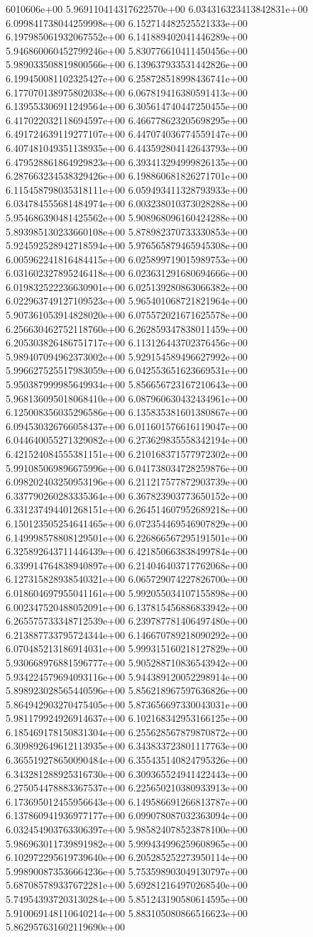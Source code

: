 6010606e+00	5.969110414317622570e+00	6.034316323413842831e+00	6.099841738044259998e+00	6.152714482525521333e+00	6.197985061932067552e+00	6.141889402041446289e+00	5.946860060452799246e+00	5.830776610411450456e+00	5.989033508819800566e+00	6.139637933531442826e+00	6.199450081102325427e+00	6.258728518998436741e+00	6.177070138975802038e+00	6.067819416380591413e+00	6.139553306911249564e+00	6.305614740447250455e+00	6.417022032118694597e+00	6.466778623205698295e+00	6.491724639119277107e+00	6.447074036774559147e+00	6.407481049351138935e+00	6.443592804142643793e+00	6.479528861864929823e+00	6.393413294999826135e+00	6.287663234538329426e+00	6.198860681826271701e+00	6.115458798035318111e+00	6.059493411328793933e+00	6.034784555681484974e+00	6.003238010373028288e+00	5.954686390481425562e+00	5.908968096160424288e+00	5.893985130233660108e+00	5.878982370733330853e+00	5.924592528942718594e+00	5.976565879465945308e+00	6.005962241816484415e+00	6.025899719015989753e+00	6.031602327895246418e+00	6.023631291680694666e+00	6.019832522236630901e+00	6.025139280863066382e+00	6.022963749127109523e+00	5.965401068721821964e+00	5.907361053914828020e+00	6.075572021671625578e+00	6.256630462752118760e+00	6.262859347838011459e+00	6.205303826486751717e+00	6.113126443702376456e+00	5.989407094962373002e+00	5.929154589496627992e+00	5.996627525517983059e+00	6.042553651623669531e+00	5.950387999985649934e+00	5.856656723167210643e+00	5.968136095018068410e+00	6.087960630432434961e+00	6.125008356035296586e+00	6.135835381601380867e+00	6.094530326766058437e+00	6.011601576616119047e+00	6.044640055271329082e+00	6.273629835558342194e+00	6.421524084555381151e+00	6.210168371577972302e+00	5.991085069896675996e+00	6.041738034728259876e+00	6.098202403250953196e+00	6.211217577872903739e+00	6.337790260283335364e+00	6.367823903773650152e+00	6.331237494401268151e+00	6.264514607952689218e+00	6.150123505254641465e+00	6.072354469546907829e+00	6.149998578808129501e+00	6.226866567295191501e+00	6.325892643711446439e+00	6.421850663838499784e+00	6.339914764838940897e+00	6.214046403717762068e+00	6.127315828938540321e+00	6.065729074227826700e+00	6.018604697955041161e+00	5.992055034107155898e+00	6.002347520488052091e+00	6.137815456886833942e+00	6.265575733348712539e+00	6.239787781406497480e+00	6.213887733795724344e+00	6.146670789218090292e+00	6.070485213186914031e+00	5.999315160218127829e+00	5.930668976881596777e+00	5.905288710836543942e+00	5.934224579694093116e+00	5.944389120052298914e+00	5.898923028565440596e+00	5.856218967597636826e+00	5.864942903270475405e+00	5.873656697330043031e+00	5.981179924926914637e+00	6.102168342953166125e+00	6.185469178150831304e+00	6.255628567879870872e+00	6.309892649612113935e+00	6.343833723801117763e+00	6.365519278650090484e+00	6.355435140824795326e+00	6.343281288925316730e+00	6.309365524941422443e+00	6.275054478883367537e+00	6.225650210380933913e+00	6.173695012455956643e+00	6.149586691266813787e+00	6.137860941936977177e+00	6.099078087032363094e+00	6.032454903763306397e+00	5.985824078523878100e+00	5.986963011739891982e+00	5.999434996259608965e+00	6.102972295619739640e+00	6.205285252273950114e+00	5.998900873536664236e+00	5.753598903049130797e+00	5.687085789337672281e+00	5.692812164970268540e+00	5.749543937203130284e+00	5.851243190580614595e+00	5.910069148110640214e+00	5.883105080866516623e+00	5.862957631602119690e+00